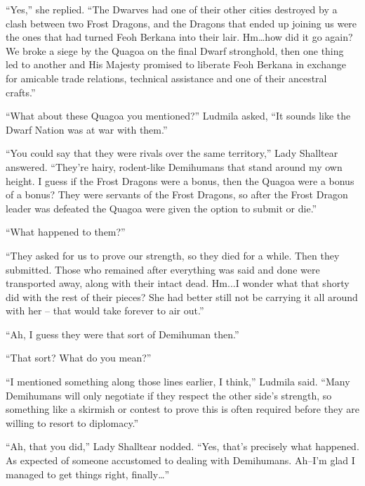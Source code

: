 “Yes,” she replied. “The Dwarves had one of their other cities destroyed by a clash between two Frost Dragons, and the Dragons that ended up joining us were the ones that had turned Feoh Berkana into their lair. Hm…how did it go again? We broke a siege by the Quagoa on the final Dwarf stronghold, then one thing led to another and His Majesty promised to liberate Feoh Berkana in exchange for amicable trade relations, technical assistance and one of their ancestral crafts.”

 

“What about these Quagoa you mentioned?” Ludmila asked, “It sounds like the Dwarf Nation was at war with them.”

 

“You could say that they were rivals over the same territory,” Lady Shalltear answered. “They’re hairy, rodent-like Demihumans that stand around my own height. I guess if the Frost Dragons were a bonus, then the Quagoa were a bonus of a bonus? They were servants of the Frost Dragons, so after the Frost Dragon leader was defeated the Quagoa were given the option to submit or die.”

 

“What happened to them?”

 

“They asked for us to prove our strength, so they died for a while. Then they submitted. Those who remained after everything was said and done were transported away, along with their intact dead. Hm...I wonder what that shorty did with the rest of their pieces? She had better still not be carrying it all around with her – that would take forever to air out.”

 

“Ah, I guess they were that sort of Demihuman then.”

 

“That sort? What do you mean?”

 

“I mentioned something along those lines earlier, I think,” Ludmila said. “Many Demihumans will only negotiate if they respect the other side’s strength, so something like a skirmish or contest to prove this is often required before they are willing to resort to diplomacy.”

 

“Ah, that you did,” Lady Shalltear nodded. “Yes, that’s precisely what happened. As expected of someone accustomed to dealing with Demihumans. Ah–I’m glad I managed to get things right, finally…”


